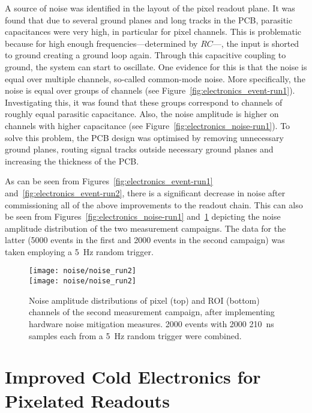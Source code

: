 A source of noise was identified in the layout of the pixel readout plane.
It was found that due to several ground planes and long tracks in the PCB, parasitic capacitances were very high, in particular for pixel channels.
This is problematic because for high enough frequencies---determined by $RC$---, the input is shorted to ground creating a ground loop again.
Through this capacitive coupling to ground, the system can start to oscillate.
One evidence for this is that the noise is equal over multiple channels, so-called common-mode noise.
More specifically, the noise is equal over groups of channels (see Figure~\ref{fig:electronics_event-run1}).
Investigating this, it was found that these groups correspond to channels of roughly equal parasitic capacitance.
Also, the noise amplitude is higher on channels with higher capacitance (see Figure~\ref{fig:electronics_noise-run1}).
To solve this problem, the PCB design was optimised by removing unnecessary ground planes, routing signal tracks outside necessary ground planes and increasing the thickness of the PCB.

As can be seen from Figures~\ref{fig:electronics_event-run1} and~\ref{fig:electronics_event-run2}, there is a significant decrease in noise after commissioning all of the above improvements to the readout chain.
This can also be seen from Figures~\ref{fig:electronics_noise-run1} and~\ref{fig:electronics_noise-run2} depicting the noise amplitude distribution of the two measurement campaigns.
The data for the latter (\num{5000} events in the first and \num{2000} events in the second campaign) was taken employing a \SI{5}{\hertz} random trigger.

\begin{figure}[htb]
	\centering
	\texttt{[image: noise/noise\_run2]} \\
	\texttt{[image: noise/noise\_run2]}
	\caption{Noise amplitude distributions of pixel (top) and ROI (bottom) channels of the second measurement campaign, after implementing hardware noise mitigation measures.
	\num{2000} events with \num{2000} \SI{210}{\nano\second} samples each from a \SI{5}{\hertz} random trigger were combined.}
	\label{fig:electronics_noise-run2}
\end{figure}


\section{Improved Cold Electronics for Pixelated Readouts}
\label{sec:electronics_pixels}

